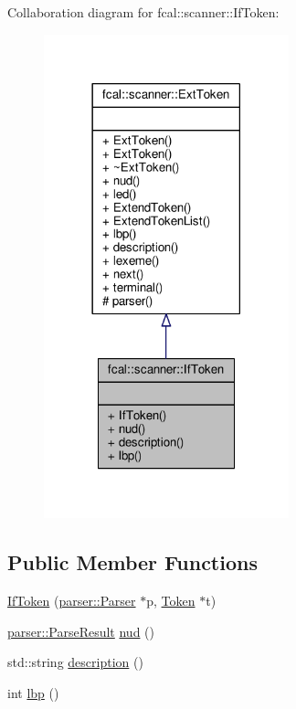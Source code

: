 Collaboration diagram for fcal\+:\+:scanner\+:\+:If\+Token\+:
\nopagebreak
\begin{figure}[H]
\begin{center}
\leavevmode
\includegraphics[width=201pt]{classfcal_1_1scanner_1_1IfToken__coll__graph}
\end{center}
\end{figure}
\subsection*{Public Member Functions}
\begin{DoxyCompactItemize}
\item 
\hyperlink{classfcal_1_1scanner_1_1IfToken_ab62190e056e132f94f99077fd48049fc}{If\+Token} (\hyperlink{classfcal_1_1parser_1_1Parser}{parser\+::\+Parser} $\ast$p, \hyperlink{classfcal_1_1scanner_1_1Token}{Token} $\ast$t)
\item 
\hyperlink{classfcal_1_1parser_1_1ParseResult}{parser\+::\+Parse\+Result} \hyperlink{classfcal_1_1scanner_1_1IfToken_a66e666cbade5d1be24d0639dad88a594}{nud} ()
\item 
std\+::string \hyperlink{classfcal_1_1scanner_1_1IfToken_a76c60330e996fab7bbcaaab1f825d62c}{description} ()
\item 
int \hyperlink{classfcal_1_1scanner_1_1IfToken_a8ef9ce247acf496793ef3cecafea1c42}{lbp} ()
\end{DoxyCompactItemize}
